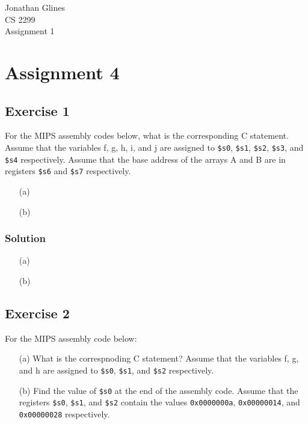 \documentclass[12pt]{article}
\begin{document}
\begin{flushright}
{\Large Jonathan Glines \\
CS 2299 \\
Assignment 1 \\
}
\end{flushright}
\section*{Assignment 4}
\subsection*{Exercise 1}
For the MIPS assembly codes below, what is the corresponding C statement. Assume that the variables f, g, h, i, and j are assigned to {\tt \$s0}, {\tt \$s1}, {\tt \$s2}, {\tt \$s3}, and {\tt \$s4} respectively. Assume that the base address of the arrays A and B are in registers {\tt \$s6} and {\tt \$s7} respectively.
\begin{itemize}
\item[(a)]


\item[(b)]

\end{itemize}
\subsubsection*{Solution}
\begin{itemize}
\item[(a)] 

\item[(b)] 
\end{itemize}

\subsection*{Exercise 2}
For the MIPS assembly code below:
\begin{itemize}
\item[(a)] What is the correspnoding C statement? Assume that the variables f, g, and h are assigned to {\tt \$s0}, {\tt \$s1}, and {\tt \$s2} respectively.
\item[(b)] Find the value of {\tt \$s0} at the end of the assembly code. Assume that the registers {\tt \$s0}, {\tt \$s1}, and {\tt \$s2} contain the values {\tt 0x0000000a}, {\tt 0x00000014}, and {\tt 0x00000028} respectively.
\end{itemize}

\end{document}
